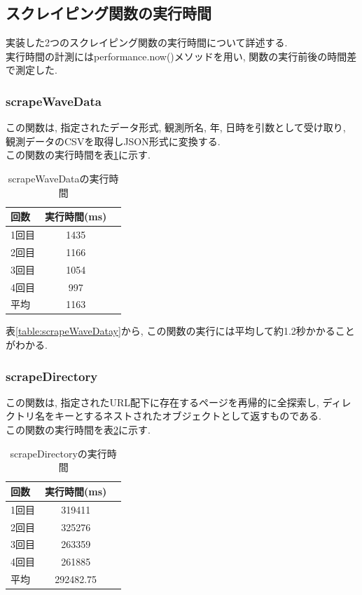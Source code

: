 \subsection{スクレイピング関数の実行時間}
実装した2つのスクレイピング関数の実行時間について詳述する. \\
実行時間の計測にはperformance.now()メソッドを用い, 関数の実行前後の時間差で測定した. 

\subsubsection{scrapeWaveData}
この関数は, 指定されたデータ形式, 観測所名, 年, 日時を引数として受け取り, 観測データのCSVを取得しJSON形式に変換する. \\
この関数の実行時間を表\ref{table:scrapeWaveData}に示す. 

\begin{table}[hbtp]
	\caption{scrapeWaveDataの実行時間}
	\label{table:scrapeWaveData}
	\centering
	\begin{tabular}{lcr}
		\hline
		回数  & 実行時間(ms) \\
		\hline \hline
		1回目 & 1435     \\
		2回目 & 1166     \\
		3回目 & 1054     \\
		4回目 & 997      \\
		\hline
		平均  & 1163
	\end{tabular}
\end{table}

表\ref{table:scrapeWaveDatay}から, この関数の実行には平均して約1.2秒かかることがわかる. 

\subsubsection{scrapeDirectory}
この関数は, 指定されたURL配下に存在するページを再帰的に全探索し, ディレクトリ名をキーとするネストされたオブジェクトとして返すものである. \\
この関数の実行時間を表\ref{table:scrapeDirectory}に示す. 

\begin{table}[hbtp]
	\caption{scrapeDirectoryの実行時間}
	\label{table:scrapeDirectory}
	\centering
	\begin{tabular}{lcr}
		\hline
		回数  & 実行時間(ms)   \\
		\hline \hline
		1回目 & 319411     \\
		2回目 & 325276     \\
		3回目 & 263359     \\
		4回目 & 261885     \\
		\hline
		平均  & 292482.75
	\end{tabular}
\end{table}

